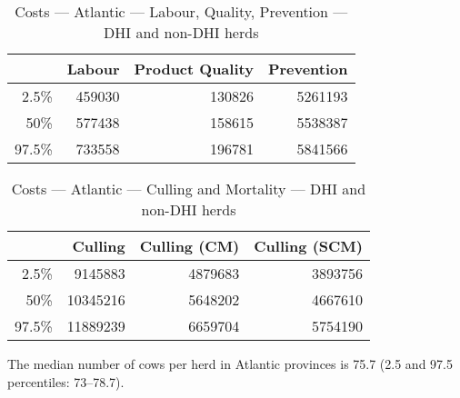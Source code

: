 \documentclass{article}\usepackage[]{graphicx}\usepackage[]{color}
\begin{document}
\begin{table}[ht]
\centering
\begin{tabular}{rrrr}
  \hline
 & Labour & Product Quality & Prevention \\ 
  \hline
2.5\% & 459030 & 130826 & 5261193 \\ 
  50\% & 577438 & 158615 & 5538387 \\ 
  97.5\% & 733558 & 196781 & 5841566 \\ 
   \hline
\end{tabular}
\caption{Costs --- Atlantic --- Labour, Quality, Prevention --- DHI and non-DHI herds} 
\label{tab:atlantic2:b}
\end{table}
\begin{table}[ht]
\centering
\begin{tabular}{rrrr}
  \hline
 & Culling & Culling (CM) & Culling (SCM) \\ 
  \hline
2.5\% & 9145883 & 4879683 & 3893756 \\ 
  50\% & 10345216 & 5648202 & 4667610 \\ 
  97.5\% & 11889239 & 6659704 & 5754190 \\ 
   \hline
\end{tabular}
\caption{Costs --- Atlantic --- Culling and Mortality --- DHI and non-DHI herds} 
\label{tab:atlantic2:c}
\end{table}


The median number of cows per herd in Atlantic provinces is
75.7 (2.5 and 97.5 percentiles:
73--78.7).
\clearpage
\end{document}
